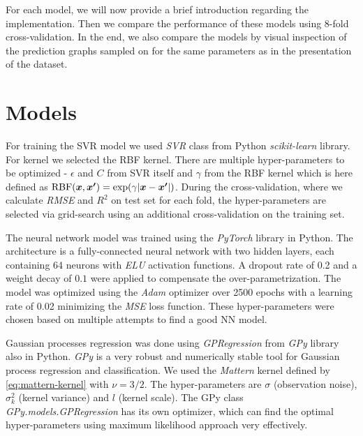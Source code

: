 For each model, we will now provide a brief introduction regarding the implementation. Then we compare the performance of these models using 8-fold cross-validation. In the end, we also compare the models by visual inspection of the prediction graphs sampled on for the same parameters as in the presentation of the dataset.

\section{Models}
\label{sec:temp-models}

For training the SVR model we used \textit{SVR} class from Python \textit{scikit-learn} library. For kernel we selected the RBF kernel. There are multiple hyper-parameters to be optimized - $\epsilon$ and $C$ from SVR itself and $\gamma$ from the RBF kernel which is here defined as $\mathrm{RBF}(\bm{x},\bm{x^\prime}) = \mathrm{exp}(\gamma \lvert \bm{x}-\bm{x^\prime} \rvert)$. During the cross-validation, where we calculate \textit{RMSE} and $R^2$ on test set for each fold, the hyper-parameters are selected via grid-search using an additional cross-validation on the training set.

The neural network model was trained using the \textit{PyTorch} library in Python. The architecture is a fully-connected neural network with two hidden layers, each containing 64 neurons with \textit{ELU} activation functions. A dropout rate of 0.2 and a weight decay of $0.1$ were applied to compensate the over-parametrization. The model was optimized using the \textit{Adam} optimizer over 2500 epochs with a learning rate of 0.02 minimizing the \textit{MSE} loss function. These hyper-parameters were chosen based on multiple attempts to find a good NN model.

Gaussian processes regression was done using \textit{GPRegression} from \textit{GPy} library also in Python. \textit{GPy} is a very robust and numerically stable tool for Gaussian process regression and classification. We used the \textit{Mattern} kernel defined by \ref{eq:mattern-kernel} with $\nu = 3/2$. The hyper-parameters are $\sigma$ (observation noise), $\sigma_k^2$ (kernel variance) and $l$ (kernel scale). The GPy class \textit{GPy.models.GPRegression} has its own optimizer, which can find the optimal hyper-parameters using maximum likelihood approach very effectively. 

